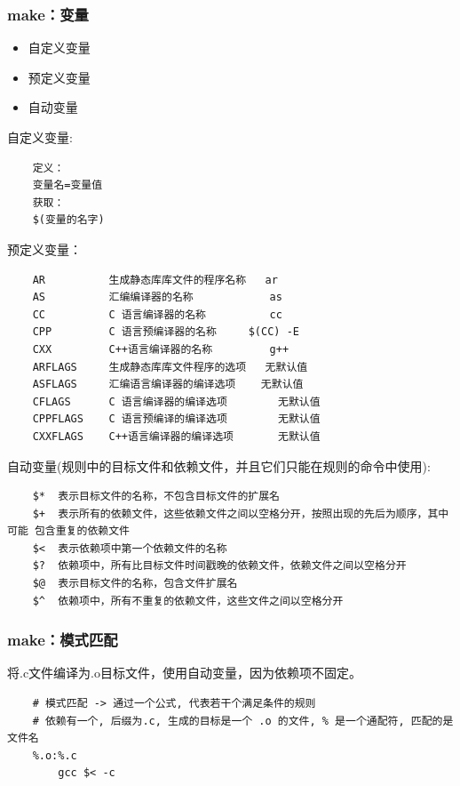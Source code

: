 \documentclass[UTF8]{ctexart}
\begin{document}
\subsubsection{make：变量}
\begin{itemize}
	\item 自定义变量
	\item 预定义变量
	\item 自动变量
\end{itemize}
自定义变量:
\begin{verbatim}
	定义：
	变量名=变量值
	获取：
	$(变量的名字)
\end{verbatim}
预定义变量：
\begin{verbatim}
	AR			生成静态库库文件的程序名称	ar
	AS			汇编编译器的名称			as
	CC			C 语言编译器的名称			cc
	CPP			C 语言预编译器的名称		$(CC) -E
	CXX			C++语言编译器的名称	 		g++
	ARFLAGS		生成静态库库文件程序的选项	无默认值
	ASFLAGS		汇编语言编译器的编译选项	无默认值
	CFLAGS		C 语言编译器的编译选项		无默认值
	CPPFLAGS	C 语言预编译的编译选项		无默认值
	CXXFLAGS	C++语言编译器的编译选项		无默认值
\end{verbatim}
自动变量(规则中的目标文件和依赖文件，并且它们只能在规则的命令中使用):
\begin{verbatim}
	$*	表示目标文件的名称，不包含目标文件的扩展名
	$+	表示所有的依赖文件，这些依赖文件之间以空格分开，按照出现的先后为顺序，其中可能 包含重复的依赖文件
	$<	表示依赖项中第一个依赖文件的名称
	$?	依赖项中，所有比目标文件时间戳晚的依赖文件，依赖文件之间以空格分开
	$@	表示目标文件的名称，包含文件扩展名
	$^	依赖项中，所有不重复的依赖文件，这些文件之间以空格分开
\end{verbatim}


\subsubsection{make：模式匹配}
将.c文件编译为.o目标文件，使用自动变量，因为依赖项不固定。
\begin{verbatim}
	# 模式匹配 -> 通过一个公式, 代表若干个满足条件的规则
	# 依赖有一个, 后缀为.c, 生成的目标是一个 .o 的文件, % 是一个通配符, 匹配的是文件名
	%.o:%.c
		gcc $< -c
\end{verbatim}
\end{document}
